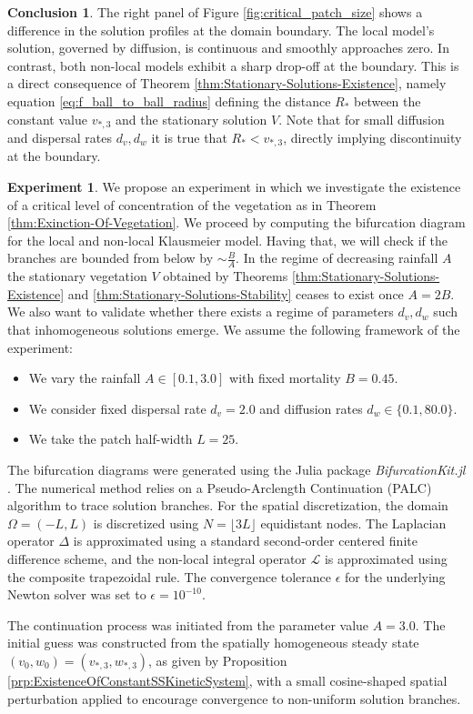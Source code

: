 \documentclass[preprint,12pt]{elsarticle}
\theoremstyle{plain}
\theoremstyle{definition}
\newtheorem{expe}{Experiment}[section]
\newtheorem{con}{Conclusion}[section]
\theoremstyle{remark}
\begin{document}
\begin{con}
The right panel of Figure \ref{fig:critical_patch_size} shows a difference in the solution profiles at the domain boundary. The local model's solution, governed by diffusion, is continuous and smoothly approaches zero. In contrast, both non-local models exhibit a sharp drop-off at the boundary. This is a direct consequence of Theorem \ref{thm:Stationary-Solutions-Existence}, namely equation \eqref{eq:f_ball_to_ball_radius} defining the distance $R_*$ between the constant value $v_{*, 3}$ and the stationary solution $V$. Note that for small diffusion and dispersal rates $d_v, d_w$ it is true that $R_* < v_{*, 3}$, directly implying discontinuity at the boundary.
\end{con}

\begin{expe}
    We propose an experiment in which we investigate the existence of a critical level of concentration of the vegetation as in Theorem \ref{thm:Exinction-Of-Vegetation}. We proceed by computing the bifurcation diagram for the local and non-local Klausmeier model. Having that, we will check if the branches are bounded from below by $\sim\frac{B}{A}$. In the regime of decreasing rainfall $A$ the stationary vegetation $V$ obtained by Theorems \ref{thm:Stationary-Solutions-Existence} and \ref{thm:Stationary-Solutions-Stability} ceases to exist once $A = 2B$. We also want to validate whether there exists a regime of parameters $d_v, d_w$ such that inhomogeneous solutions emerge. We assume the following framework of the experiment:
    \begin{itemize}
        \item We vary the rainfall $A \in [0.1, 3.0]$ with fixed mortality $B = 0.45$.
        \item We consider fixed dispersal rate $d_v = 2.0$ and diffusion rates $d_w \in \{0.1, 80.0\}$.
        \item We take the patch half-width $L = 25$.
    \end{itemize}
    The bifurcation diagrams were generated using the Julia package \textit{BifurcationKit.jl} \cite{BifurcationKit.jl}. The numerical method relies on a Pseudo-Arclength Continuation (PALC) algorithm \cite{Chan1984, Keller1988} to trace solution branches. For the spatial discretization, the domain $\Omega = (-L, L)$ is discretized using $N = \lfloor 3L \rfloor$ equidistant nodes. The Laplacian operator $\Delta$ is approximated using a standard second-order centered finite difference scheme, and the non-local integral operator $\mathcal{L}$ is approximated using the composite trapezoidal rule. The convergence tolerance $\epsilon$ for the underlying Newton solver was set to $\epsilon = 10^{-10}$.

    The continuation process was initiated from the parameter value $A = 3.0$. The initial guess was constructed from the spatially homogeneous steady state $(v_0, w_0) = (v_{*, 3}, w_{*, 3})$, as given by Proposition \ref{prp:ExistenceOfConstantSSKineticSystem}, with a small cosine-shaped spatial perturbation applied to encourage convergence to non-uniform solution branches.
\end{expe}
\end{document}
